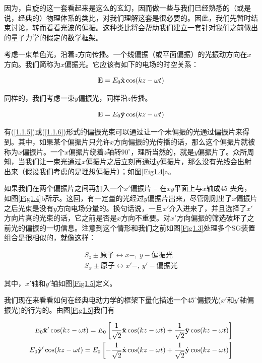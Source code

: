 \documentclass[UTF8,twoside]{ctexart}
\begin{document}
\noindent 因为，自旋的这一套看起来是这么的玄幻，因而做一些与我们已经熟悉的（或是说，经典的）物理体系的类比，对我们理解这套是很必要的。因此，我们先暂时结束讨论，转而看看光波的偏振。这种类比将会帮助我们建立一套针对我们之前做出的量子力学的假定的数学框架。

考虑一束单色光，沿着$z$方向传播。一个线偏振（或平面偏振）的光振动方向在$x$方向。我们简称为$x$偏振光。它应该有如下的电场的时空关系：

\begin{equation} \label{1.1.5}
{\bf E} = E_0 \hat{\bf x} \cos (kz - \omega t)
\end{equation}

\noindent 同样的，我们考虑一束$y$偏振光，同样沿$z$传播。

\begin{equation} \label{1.1.6}
{\bf E} = E_0 \hat{\bf y} \cos (kz - \omega t)
\end{equation}

\noindent 有(\ref{1.1.5})或(\ref{1.1.6})形式的偏振光束可以通过让一个未偏振的光通过偏振片来得到。其中，如果某个偏振片只允许$x$方向偏振的光传播的话，那么这个偏振片就被称为$x$偏振片。一个$x$偏振片绕着$z$轴转$90^{\circ}$，理所当然的，就是$y$偏振片了。众所周知，当我们让一束光通过$x$偏振片之后立刻再通过$y$偏振片，那么没有光线会出射出来（假设我们考虑的是理想偏振片）；如图\ref{Fig1.4}a。

如果我们在两个偏振片之间再加入一个$x'$偏振片 -- 在$xy$平面上与$x$轴成$45^{\circ}$夹角，如图\ref{Fig1.4}b所示。这回，有一定量的光经过$y$偏振片出来，尽管刚刚出了$x$偏振片之后光束是没有$y$方向电场分量的。换句话说，一旦$x'$介入进来了，并且选择了$x'$方向片真的光束的话，它之前是否是$x$方向不重要。对$x'$方向偏振的筛选破坏了之前光的偏振的一切信息。注意到这个情形和我们之前如图{\ref{Fig1.3}}处理多个SG装置组合是很相似的，就像这样：

\begin{equation} \label{1.1.7}
\begin{split}
S_z \pm \text{原子} \leftrightarrow x-,\ y-\text{偏振光}\\
S_x \pm \text{原子} \leftrightarrow x'-,\ y'-\text{偏振光}
\end{split}
\end{equation}

\noindent 其中，$x'$轴和$y'$轴如图{\ref{Fig1.5}}定义。

我们现在来看看如何在经典电动力学的框架下量化描述一个$45^{\circ}$偏振光($x'$和$y'$轴偏振光)的行为的。由图{\ref{Fig1.5}}我们有

\begin{equation} \label{1.1.8}
\begin{split}
E_0{\hat{\bf x}}'\cos(kz-\omega t) = E_0\left[\frac{1}{\sqrt{2}}{\hat{\bf x}}\cos(kz-\omega t) + \frac{1}{\sqrt{2}}{\hat{\bf y}}\cos(kz-\omega t)\right]\\
E_0{\hat{\bf y}}'\cos(kz-\omega t) = E_0\left[-\frac{1}{\sqrt{2}}{\hat{\bf x}}\cos(kz-\omega t) + \frac{1}{\sqrt{2}}{\hat{\bf y}}\cos(kz-\omega t)\right]
\end{split}
\end{equation}
\end{document}
